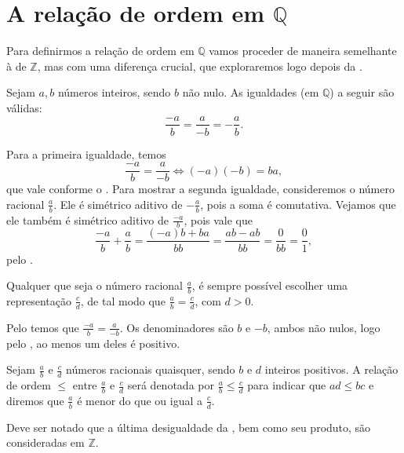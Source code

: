 \documentclass[../main.tex]{subfiles}
\begin{document}
\section{A relação de ordem em $\mathbb{Q}$}
Para definirmos a relação de ordem em $\mathbb{Q}$ vamos proceder de maneira semelhante à de $\mathbb{Z}$, mas com uma diferença crucial, que exploraremos logo depois da .
\begin{teo}\label{rac-teo-trocaSinaisNumeradorDenominador}
    Sejam $a,b$ números inteiros, sendo $b$ não nulo. As igualdades (em $\mathbb{Q}$) a seguir são válidas:
    \[ \frac{-a}{b} = \frac{a}{-b} = -\frac{a}{b}. \]
\end{teo}
\begin{dem}
    Para a primeira igualdade, temos 
    \[ \frac{-a}{b} = \frac{a}{-b} \iff (-a)(-b) = ba, \]
    que vale conforme o .
    Para mostrar a segunda igualdade, consideremos o número racional $\frac{a}{b}$. Ele é simétrico aditivo de $-\frac{a}{b}$, pois a soma é comutativa. Vejamos que ele também é simétrico aditivo de $\frac{-a}{b}$, pois vale que 
    \[ \frac{-a}{b} + \frac{a}{b} = \frac{(-a)b + ba}{bb} = \frac{ab - ab}{bb} = \frac{0}{bb} = \frac{0}{1}, \] 
    pelo .
\end{dem}
\begin{corol}\label{rac-corol-escolhaDenominador}
    Qualquer que seja o número racional $\frac{a}{b}$, é sempre possível escolher uma representação $\frac{c}{d}$, de tal modo que $\frac{a}{b} = \frac{c}{d}$, com $d > 0$.
\end{corol}
\begin{dem}
    Pelo  temos que $\frac{-a}{b} = \frac{a}{-b}$. Os denominadores são $b$ e $-b$, ambos não nulos, logo pelo , ao menos um deles é positivo.
\end{dem}

\begin{defi}\label{rac-def-relacaoOrdem}
    Sejam $\frac{a}{b}$ e $\frac{c}{d}$ números racionais quaisquer, sendo $b$ e $d$ inteiros positivos. A relação de ordem $\leq$ entre $\frac{a}{b}$ e $\frac{c}{d}$ será denotada por $\frac{a}{b} \leq \frac{c}{d}$ para indicar que $ad \leq bc$ e diremos que $\frac{a}{b}$ é menor do que ou igual a $\frac{c}{d}$. 
\end{defi}
\begin{obs}
    Deve ser notado que a última desigualdade da , bem como seu produto, são consideradas em $\mathbb{Z}$.
\end{obs}
\end{document}
